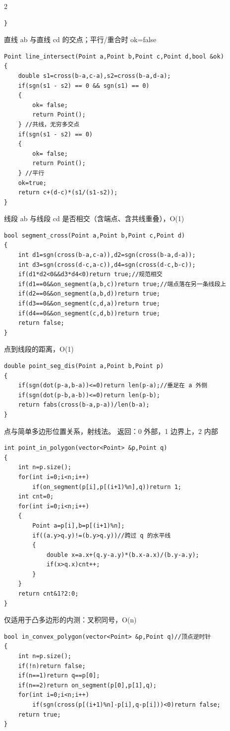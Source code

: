 \documentclass[UTF8,fontset=fandol,a4paper,twoside]{ctexart}
\newcommand{\note}[1]{{\fontsize{10}{12}\selectfont #1\par}}
\begin{document}
\begin{multicols}{2}
\begin{lstlisting}
}
\end{lstlisting}
\note{直线 ab 与直线 cd 的交点；平行/\allowbreak{}重合时 ok=\allowbreak{}false}
\begin{lstlisting}
Point line_intersect(Point a,Point b,Point c,Point d,bool &ok)
{
    double s1=cross(b-a,c-a),s2=cross(b-a,d-a);
    if(sgn(s1 - s2) == 0 && sgn(s1) == 0)
    {
        ok= false;
        return Point();
    } //共线，无穷多交点
    if(sgn(s1 - s2) == 0)
    {
        ok= false;
        return Point();
    } //平行
    ok=true;
    return c+(d-c)*(s1/(s1-s2));
}
\end{lstlisting}
\note{线段 ab 与线段 cd 是否相交（含端点、含共线重叠），O(\allowbreak{}1)\allowbreak{}}
\begin{lstlisting}
bool segment_cross(Point a,Point b,Point c,Point d)
{
    int d1=sgn(cross(b-a,c-a)),d2=sgn(cross(b-a,d-a));
    int d3=sgn(cross(d-c,a-c)),d4=sgn(cross(d-c,b-c));
    if(d1*d2<0&&d3*d4<0)return true;//规范相交
    if(d1==0&&on_segment(a,b,c))return true;//端点落在另一条线段上
    if(d2==0&&on_segment(a,b,d))return true;
    if(d3==0&&on_segment(c,d,a))return true;
    if(d4==0&&on_segment(c,d,b))return true;
    return false;
}
\end{lstlisting}
\note{点到线段的距离，O(\allowbreak{}1)\allowbreak{}}
\begin{lstlisting}
double point_seg_dis(Point a,Point b,Point p)
{
    if(sgn(dot(p-a,b-a))<=0)return len(p-a);//垂足在 a 外侧
    if(sgn(dot(p-b,a-b))<=0)return len(p-b);
    return fabs(cross(b-a,p-a))/len(b-a);
}
\end{lstlisting}
\note{点与简单多边形位置关系，射线法。 返回：0 外部，1 边界上，2 内部}
\begin{lstlisting}
int point_in_polygon(vector<Point> &p,Point q)
{
    int n=p.size();
    for(int i=0;i<n;i++)
        if(on_segment(p[i],p[(i+1)%n],q))return 1;
    int cnt=0;
    for(int i=0;i<n;i++)
    {
        Point a=p[i],b=p[(i+1)%n];
        if((a.y>q.y)!=(b.y>q.y))//跨过 q 的水平线
        {
            double x=a.x+(q.y-a.y)*(b.x-a.x)/(b.y-a.y);
            if(x>q.x)cnt++;
        }
    }
    return cnt&1?2:0;
}
\end{lstlisting}
\note{仅适用于凸多边形的内测：叉积同号，O(\allowbreak{}n)\allowbreak{}}
\begin{lstlisting}
bool in_convex_polygon(vector<Point> &p,Point q)//顶点逆时针
{
    int n=p.size();
    if(!n)return false;
    if(n==1)return q==p[0];
    if(n==2)return on_segment(p[0],p[1],q);
    for(int i=0;i<n;i++)
        if(sgn(cross(p[(i+1)%n]-p[i],q-p[i]))<0)return false;
    return true;
}
\end{lstlisting}

\end{multicols}
\end{document}

